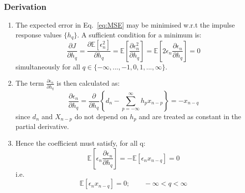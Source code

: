 \documentclass[12pt]{article}
\newcommand{\dydx}[2]{\frac{\partial{#1}}{\partial{#2}}}
\newcommand{\mexp}{\mathbb{E}}
\newcommand{\summ}[2]{\sum_{#1}^{#2}}
\newcommand{\sumpinfinf}{\summ{p=-\infty}{\infty}}
\newcommand{\des}{d_n}
\newcommand{\err}{\epsilon_n}
\begin{document}
\subsubsection{Derivation}
\begin{enumerate}
    \item The expected error in Eq.~\ref{eq:MSE} may be minimised w.r.t the impulse response values $\{h_q\}$. A sufficient condition for a minimum is: 
    \[
    \dydx{J}{h_q} = \dydx{\mexp[\err^2]}{h_q}=\mexp\left[ \dydx{\err^2}{h_q}\right] = \mexp\left[ 2\err\dydx{\err}{h_q}\right] = 0
    \]
    simultaneously for all $q \in \{-\infty,...,-1,0,1,...,\infty \}$.
    \item The term $\dydx{\err}{h_q}$ is then calculated as:
    \[
    \dydx{\err}{h_q} = \dydx{}{h_q}\left\{d_n - \sumpinfinf h_p x_{n-p} \right\} = -x_{n-q}
    \]
    since $\des$ and $X_{n-p}$ do not depend on $h_p$ and are treated as constant in the partial derivative.
    \item Hence the coefficient must satisfy, for all q:
    \[
    \mexp\left[ \err \dydx{\err}{h_q}\right] = -\mexp[\err x_{n-q}] = 0
    \]
    i.e. 
    \begin{equation}
        \mexp[\err x_{n-q}] = 0; \qquad -\infty < q < \infty
        \label{eq:error_ortho}
    \end{equation}
    

\end{enumerate}
\end{document}
